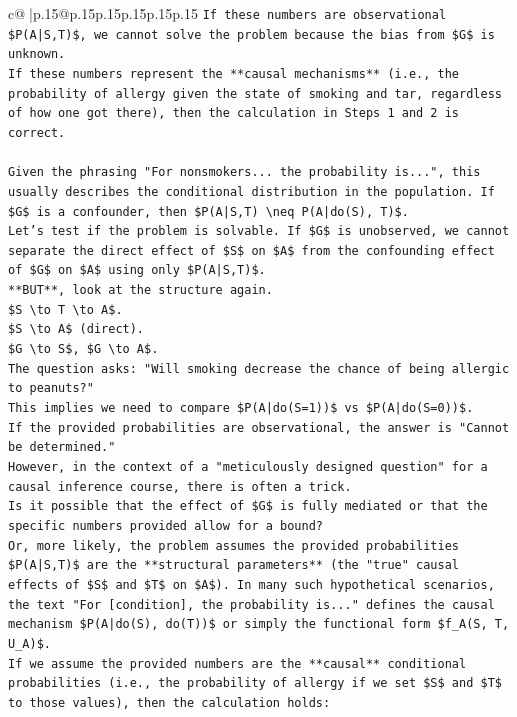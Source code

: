 \documentclass{article}
\begin{document}
{\begin{supertabular}{c@{$\;$}|p{.15\linewidth}@{}p{.15\linewidth}p{.15\linewidth}p{.15\linewidth}p{.15\linewidth}p{.15\linewidth}}
{{{\texttt{If these numbers are observational \$P(A|S,T)\$, we cannot solve the problem because the bias from \$G\$ is unknown.} \\
\texttt{If these numbers represent the **causal mechanisms** (i.e., the probability of allergy given the state of smoking and tar, regardless of how one got there), then the calculation in Steps 1 and 2 is correct.} \\
\\ 
\texttt{Given the phrasing "For nonsmokers... the probability is...", this usually describes the conditional distribution in the population. If \$G\$ is a confounder, then \$P(A|S,T) \textbackslash{}neq P(A|do(S), T)\$.} \\
\texttt{Let's test if the problem is solvable. If \$G\$ is unobserved, we cannot separate the direct effect of \$S\$ on \$A\$ from the confounding effect of \$G\$ on \$A\$ using only \$P(A|S,T)\$.} \\
\texttt{**BUT**, look at the structure again.} \\
\texttt{\$S \textbackslash{}to T \textbackslash{}to A\$.} \\
\texttt{\$S \textbackslash{}to A\$ (direct).} \\
\texttt{\$G \textbackslash{}to S\$, \$G \textbackslash{}to A\$.} \\
\texttt{The question asks: "Will smoking decrease the chance of being allergic to peanuts?"} \\
\texttt{This implies we need to compare \$P(A|do(S=1))\$ vs \$P(A|do(S=0))\$.} \\
\texttt{If the provided probabilities are observational, the answer is "Cannot be determined."} \\
\texttt{However, in the context of a "meticulously designed question" for a causal inference course, there is often a trick.} \\
\texttt{Is it possible that the effect of \$G\$ is fully mediated or that the specific numbers provided allow for a bound?} \\
\texttt{Or, more likely, the problem assumes the provided probabilities \$P(A|S,T)\$ are the **structural parameters** (the "true" causal effects of \$S\$ and \$T\$ on \$A\$). In many such hypothetical scenarios, the text "For {[}condition{]}, the probability is..." defines the causal mechanism \$P(A|do(S), do(T))\$ or simply the functional form \$f\_A(S, T, U\_A)\$.} \\
\texttt{If we assume the provided numbers are the **causal** conditional probabilities (i.e., the probability of allergy if we set \$S\$ and \$T\$ to those values), then the calculation holds:} \\
}}}
\end{supertabular}}
\end{document}
